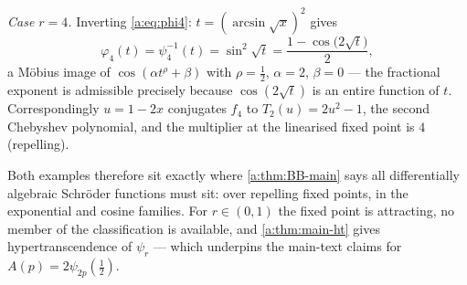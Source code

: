 \emph{Case $r=4$.} Inverting \eqref{a:eq:phi4}: $t=(\arcsin\sqrt{x})^2$ gives
\[
\varphi_4(t)=\psi_4^{-1}(t)=\sin^2\!\sqrt{t}=\frac{1-\cos\bigl(2\sqrt{t}\bigr)}{2},
\]
a M\"obius image of $\cos(\alpha t^{\rho}+\beta)$ with $\rho=\tfrac12$, $\alpha=2$, $\beta=0$ --- the fractional exponent is admissible precisely because $\cos(2\sqrt{t})$ is an entire function of $t$. Correspondingly $u=1-2x$ conjugates $f_4$ to $T_2(u)=2u^2-1$, the second Chebyshev polynomial, and the multiplier at the linearised fixed point is $4$ (repelling).

Both examples therefore sit exactly where \cref{a:thm:BB-main} says all differentially algebraic Schr\"oder functions must sit: over repelling fixed points, in the exponential and cosine families. For $r\in(0,1)$ the fixed point is attracting, no member of the classification is available, and \cref{a:thm:main-ht} gives hypertranscendence of $\psi_r$ --- which underpins the main-text claims for $A(p)=2\psi_{2p}(\tfrac12)$.
